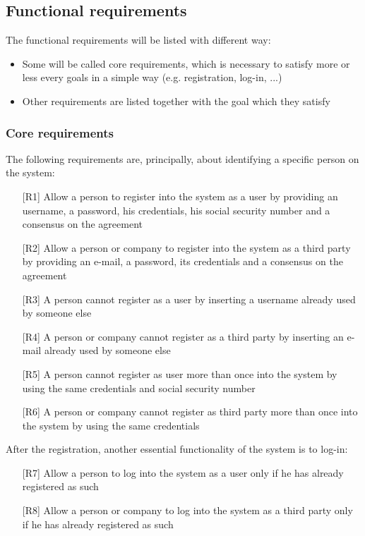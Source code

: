 \subsection{Functional requirements}
\par
The functional requirements will be listed with different way:
\begin{itemize}
\item Some will be called core requirements, which is necessary to satisfy more or less every goals in a simple way (e.g. registration, log-in, ...)
\item Other requirements are listed together with the goal which they satisfy
\end{itemize}

\subsubsection{Core requirements}
\par
The following requirements are, principally, about identifying a specific person on the system:
\begin{itemize}
\item[{[R1]}] Allow a person to register into the system as a user by providing an username, a password, his credentials, his social security number and a consensus on the agreement
\item[{[R2]}] Allow a person or company to register into the system as a third party by providing an e-mail, a password, its credentials and a consensus on the agreement
\item[{[R3]}] A person cannot register as a user by inserting a username already used by someone else
\item[{[R4]}] A person or company cannot register as a third party by inserting an e-mail already used by someone else
\item[{[R5]}] A person cannot register as user more than once into the system by using the same credentials and social security number
\item[{[R6]}] A person or company cannot register as third party more than once into the system by using the same credentials
\end{itemize}
\par
After the registration, another essential functionality of the system is to log-in:
\begin{itemize}
\item[{[R7]}] Allow a person to log into the system as a user only if he has already registered as such
\item[{[R8]}] Allow a person or company to log into the system as a third party only if he has already registered as such
\end{itemize}

